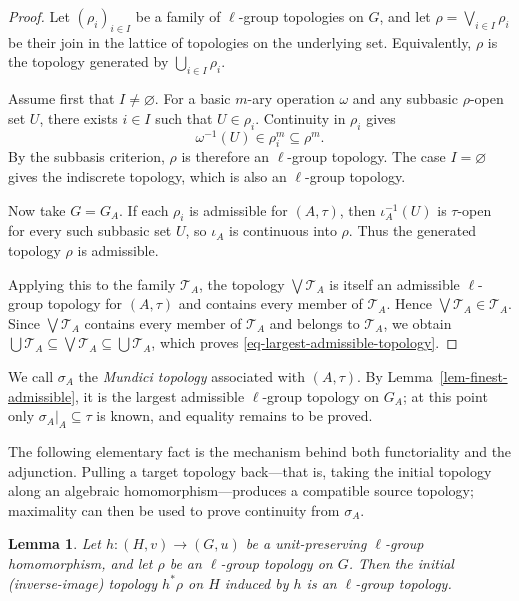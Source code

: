 \documentclass[preprint,3p]{elsarticle}
\theoremstyle{plain}
\newtheorem{lem}[thm]{Lemma}
\theoremstyle{definition}
\numberwithin{equation}{section}
\begin{document}
\begin{proof}
Let $(\rho_i)_{i\in I}$ be a family of $\ell$-group topologies
on $G$, and let $\rho=\bigvee_{i\in I}\rho_i$ be their join in the
lattice of topologies on the underlying set. Equivalently, $\rho$
is the topology generated by $\bigcup_{i\in I}\rho_i$.

Assume first that $I\neq\varnothing$. For a basic $m$-ary operation
$\omega$ and any subbasic $\rho$-open set $U$, there exists
$i\in I$ such that $U\in\rho_i$. Continuity in $\rho_i$ gives
\[
 \omega^{-1}(U)\in\rho_i^m\subseteq\rho^m .
\]
By the subbasis criterion, $\rho$ is therefore an
$\ell$-group topology. The case $I=\varnothing$ gives the
indiscrete topology, which is also an $\ell$-group topology.

Now take $G=G_A$.  If each $\rho_i$ is admissible for $(A,\tau)$, then
$\iota_A^{-1}(U)$ is $\tau$-open for every such subbasic
set $U$, so $\iota_A$ is continuous into $\rho$.
Thus the generated topology $\rho$ is admissible.

Applying this to the family $\mathcal T_A$, the topology
$\bigvee\mathcal T_A$ is itself an admissible $\ell$-group topology
for $(A,\tau)$ and contains every member of $\mathcal T_A$. Hence
$\bigvee\mathcal T_A\in\mathcal T_A$.
Since $\bigvee\mathcal T_A$ contains every member of $\mathcal T_A$
and belongs to $\mathcal T_A$, we obtain
$\bigcup\mathcal T_A
\subseteq
\bigvee\mathcal T_A
\subseteq
\bigcup\mathcal T_A$,
which proves \eqref{eq-largest-admissible-topology}.
\end{proof}

We call $\sigma_A$ the \emph{Mundici topology} associated with
$(A,\tau)$.  By Lemma~\ref{lem-finest-admissible}, it is the largest
admissible $\ell$-group topology on $G_A$; at this point only
$\sigma_A|_A\subseteq\tau$ is known, and equality remains to be proved.

The following elementary fact is the mechanism behind both functoriality
and the adjunction.  Pulling a target topology back---that is, taking the
initial topology along an algebraic homomorphism---produces a compatible
source topology; maximality can then be used to prove continuity from
$\sigma_A$.

\begin{lem}
\label{lem-pullback-topology}
Let $h\colon(H,v)\longrightarrow(G,u)$ be a unit-preserving
$\ell$-group homomorphism, and let $\rho$ be an $\ell$-group topology on
$G$.  Then the initial (inverse-image) topology $h^*\rho$ on $H$ induced by
$h$ is an $\ell$-group topology.
\end{lem}
\end{document}
